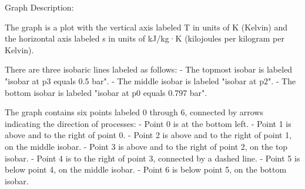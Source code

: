 Graph Description:

The graph is a plot with the vertical axis labeled T in units of K (Kelvin) and the horizontal axis labeled s in units of kJ/kg·K (kilojoules per kilogram per Kelvin).

There are three isobaric lines labeled as follows:
- The topmost isobar is labeled "isobar at p3 equals 0.5 bar".
- The middle isobar is labeled "isobar at p2".
- The bottom isobar is labeled "isobar at p0 equals 0.797 bar".

The graph contains six points labeled 0 through 6, connected by arrows indicating the direction of processes:
- Point 0 is at the bottom left.
- Point 1 is above and to the right of point 0.
- Point 2 is above and to the right of point 1, on the middle isobar.
- Point 3 is above and to the right of point 2, on the top isobar.
- Point 4 is to the right of point 3, connected by a dashed line.
- Point 5 is below point 4, on the middle isobar.
- Point 6 is below point 5, on the bottom isobar.